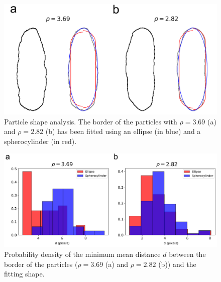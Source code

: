 \documentclass[aip,graphicx]{revtex4-1} %
\begin{document}
\begin{figure}
    \centering
    \includegraphics[width=0.95\columnwidth]{Part fit.png}
    \caption{Particle shape analysis. The border of the particles with $\rho = 3.69$ (a) and $\rho = 2.82$ (b) has been fitted using an ellipse (in blue) and a spherocylinder (in red).}\label{fig:Part_fit}
\end{figure}

\begin{figure}
    \centering
    \includegraphics[width=0.95\columnwidth]{Mean_dist.png}
    \caption{Probability density of the minimum mean distance $d$ between the border of the particles ($\rho = 3.69$ (a) and $\rho = 2.82$ (b)) and the fitting shape.}\label{fig:Mean_dist}
\end{figure}
\end{document}
